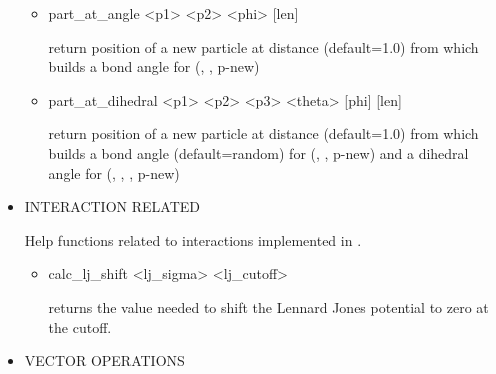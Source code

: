 \begin{itemize}
\begin{itemize}
   \item
\begin{code}
part\_at\_angle <p1> <p2> <phi> [len]
\end{code}
return position of a new particle at distance  (default=1.0)
from  which builds a bond angle  for (,
, p-new)
   \item
\begin{code}
part\_at\_dihedral <p1> <p2> <p3> <theta> [phi] [len]
\end{code}
return position of a new particle at distance  (default=1.0)
from  which builds a bond angle  (default=random) for
(, , p-new) and a dihedral angle  for
(, , , p-new)
  \end{itemize}
 \item
  INTERACTION RELATED
  
  Help functions related to interactions implemented in \es.
  \begin{itemize}
   \item 
     \begin{code}
       calc_lj_shift <lj_sigma> <lj_cutoff>
     \end{code}
     returns the value needed to shift the Lennard Jones potential to zero at the cutoff.

  \end{itemize}

 \item
  VECTOR OPERATIONS


\end{itemize}
